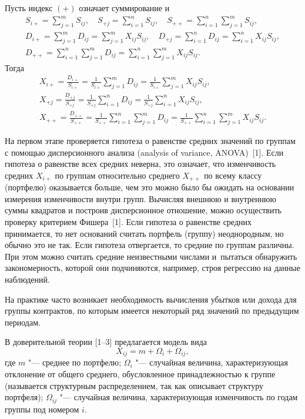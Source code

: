 Пусть индекс $(+)$ означает суммирование и
\begin{gather*}
S_{i+} =\sum_{j=1}^m {S_{ij} } ,
\quad
S_{+j} =\sum_{i=1}^n {S_{ij} } ,
\quad
S_{++} =\sum_{i=1}^n {\sum_{j=1}^m {S_{ij} } } , \\
D_{i+} =\sum_{j=1}^m {D_{ij} } =\sum_{j=1}^m {X_{ij} S_{ij} }
,
\quad
D_{+j} =\sum_{i=1}^n {D_{ij} } =\sum_{i=1}^n {X_{ij} S_{ij} }
,
\\
D_{++} =\sum_{i=1}^n {\sum_{j=1}^m {D_{ij} } }
=\sum_{i=1}^n {\sum_{j=1}^m {X_{ij} S_{ij} } } .
\end{gather*}
Тогда
\begin{gather*}
X_{i+} =\frac{D_{i+} }{S_{i+} }=\frac{1}{S_{i+} }\sum_{j=1}^m {D_{ij} }
=\frac{1}{S_{i+} }\sum_{j=1}^m {X_{ij} S_{ij} } , \\
X_{+j} =\frac{D_{+j}}{S_{+j}} =\frac{1}{S_{+j} }\sum_{i=1}^n {D_{ij} }
=\frac{1}{S_{+j} }\sum_{i=1}^n {X_{ij} S_{ij} } ,\\
X_{++} =\frac{D_{++} }{S_{++} }=\frac{1}{S_{++} }\sum_{i=1}^n
{\sum_{j=1}^m {D_{ij} } } =\frac{1}{S_{++} }\sum_{i=1}^n
{\sum_{j=1}^m {X_{ij} S_{ij} } } .
\end{gather*}

На первом этапе проверяется гипотеза о равенстве средних значений по группам
с помощью дисперсионного анализа (analysis of variance, ANOVA)~[1].
Если гипотеза о равенстве всех средних неверна, это означает, что изменчивость
средних $X_{i+} $ по группам относительно среднего $X_{++} $ по всему классу
(портфелю) оказывается больше, чем это можно было бы ожидать на основании
измерения изменчивости внутри групп.
Вычисляя внешнюю и внутреннюю суммы квадратов и построив дисперсионное отношение,
можно осуществить проверку критерием Фишера~[1].
Если гипотеза о равенстве средних принимается, то нет оснований считать
портфель (группу) неоднородным, но обычно это не так.
Если гипотеза отвергается, то средние по группам различны.
При этом можно считать средние неизвестными числами и~пытаться
обнаружить закономерность, которой они подчиняются, например,
строя регрессию на данные наблюдений.

На практике часто возникает необходимость вычисления убытков или дохода для
группы контрактов, по которым имеется некоторый ряд значений по предыдущим
периодам.

В доверительной теории [1--3] предлагается модель вида
\begin{equation}
 X_{ij} =m+\Omega _i +\Omega _{ij} ,
\end{equation}
где $m$ "--- среднее по портфелю;
$\Omega _i $ "--- случайная величина, характеризующая отклонение от общего среднего, обусловленное принадлежностью
к группе (называется структурным распределением, так как описывает структуру
портфеля); $\Omega _{ij} $ "--- случайная величина, характеризующая
изменчивость по годам группы под номером $i$.

